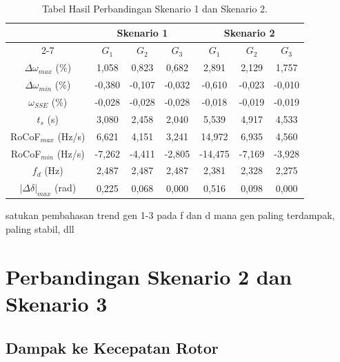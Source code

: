 \begin{table}[ht]
	\caption{Tabel Hasil Perbandingan Skenario 1 dan Skenario 2.}
	\vspace{0.5em}
	\centering
	\begin{tabular}{|c|c|c|c|c|c|c|}
        \hline
        & \multicolumn{3}{c|}{Skenario 1}
        & \multicolumn{3}{c|}{Skenario 2} \\
        \cline{2-7}
        & $G_1$ & $G_2$ & $G_3$ & $G_1$ & $G_2$ & $G_3$ \\
        \hline
        $\Delta\omega_{max}$ (\%) & 
        1,058 & 0,823 & 0,682 & 2,891 & 2,129 & 1,757 \\
        $\Delta\omega_{min}$ (\%) & 
        -0,380 & -0,107 & -0,032 & -0,610 & -0,023 & -0,010 \\
        $\omega_{SSE}$ (\%) & 
        -0,028 & -0,028 & -0,028 & -0,018 & -0,019 & -0,019 \\
        $t_s$ (s) & 
        3,080 & 2,458 & 2,040 & 5,539 & 4,917 & 4,533 \\
        RoCoF$_{max}$ (Hz/s) & 
        6,621 & 4,151 & 3,241 & 14,972 & 6,935 & 4,560 \\
        RoCoF$_{min}$ (Hz/s) & 
        -7,262 & -4,411 & -2,805 & -14,475 & -7,169 & -3,928 \\
        $f_d$ (Hz) & 
        2,487 & 2,487 & 2,487 & 2,381 & 2,328 & 2,275 \\
        $|\Delta\delta|_{max}$ (rad) & 
        0,225 & 0,068 & 0,000 & 0,516 & 0,098 & 0,000 \\
        \hline
	\end{tabular}
	\label{Tab: tabel hasil 12}
\end{table}

\FloatBarrier

satukan pembahasan trend gen 1-3 pada f dan d
mana gen paling terdampak, paling stabil, dll



\section{Perbandingan Skenario 2 dan Skenario 3}



\subsection{Dampak ke Kecepatan Rotor}


